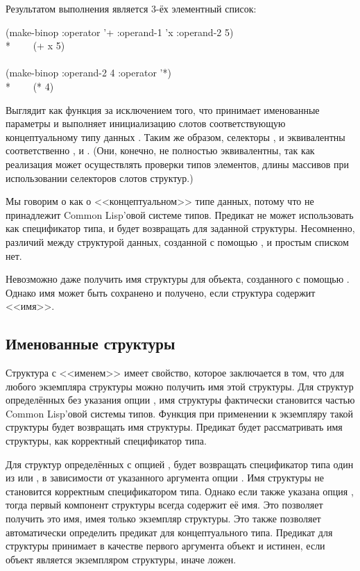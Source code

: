 Результатом выполнения  является 3-ёх элементный список:
\begin{lisp}
(make-binop :operator '+ :operand-1 'x :operand-2 5) \\*
~~~\EV\ (+ x 5) \\
\\
(make-binop :operand-2 4 :operator '*) \\*
~~~\EV\ (* {\nil} 4)
\end{lisp}
Выглядит как функция  за исключением того, что принимает именованные
параметры и выполняет инициализацию слотов соответствующую концептуальному типу
данных .
Таким же образом, селекторы ,  и
 эквивалентны соответственно ,  и
. (Они, конечно, не полностью эквивалентны, так как реализация
может осуществлять проверки типов элементов, длины массивов при использовании
селекторов слотов структур.)

Мы говорим о  как о <<концептуальном>> типе данных, потому что
 не принадлежит Common Lisp'овой системе типов. Предикат 
не может использовать  как спецификатор типа, и  будет
возвращать  для заданной  структуры. Несомненно, различий
между структурой данных, созданной с помощью , и  простым
списком нет.

Невозможно даже получить имя структуры для объекта, созданного с помощью
. Однако имя может быть сохранено и получено, если структура
содержит <<имя>>.

\subsection{Именованные структуры}

Структура с <<именем>> имеет свойство, которое заключается в том, что для любого
экземпляра структуры можно получить имя этой структуры. Для структур
определённых без указания опции , имя структуры фактически становится
частью Common Lisp'овой системы типов. Функция  при применении к
экземпляру такой структуры будет возвращать имя структуры. Предикат 
будет рассматривать имя структуры, как корректный спецификатор типа.

Для структур определённых с опцией ,  будет возвращать
спецификатор типа один из  или , в зависимости от
указанного аргумента опции .
Имя структуры не становится корректным спецификатором типа. Однако если также
указана опция , тогда первый компонент структуры всегда содержит её
имя. Это позволяет получить это имя, имея только экземпляр структуры. Это также
позволяет автоматически определить предикат для концептуального типа.
Предикат  для структуры принимает в качестве первого аргумента
объект и истинен, если объект является экземпляром структуры, иначе ложен.

